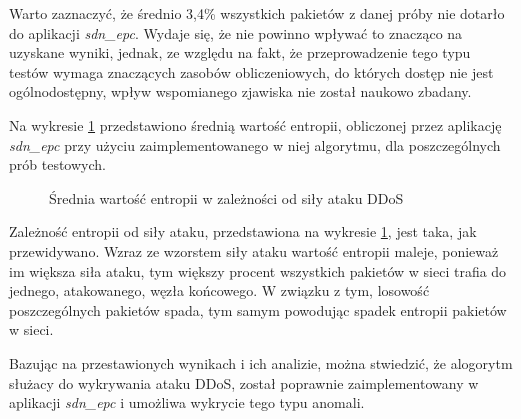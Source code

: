 Warto zaznaczyć, że średnio 3,4\% wszystkich pakietów z danej próby nie dotarło
do aplikacji \textit{sdn\_epc}. Wydaje się, że nie powinno wpływać to znacząco
na uzyskane wyniki, jednak, ze względu na fakt, że przeprowadzenie tego typu
testów wymaga znaczących zasobów obliczeniowych, do których dostęp nie jest
ogólnodostępny, wpływ wspomianego zjawiska nie został naukowo zbadany.

Na wykresie \ref{plot:entropy} przedstawiono średnią wartość entropii,
obliczonej przez aplikację \textit{sdn\_epc} przy użyciu zaimplementowanego w
niej algorytmu, dla poszczególnych prób testowych.

\begin{figure}[h]
\centering
{}
\caption{Średnia wartość entropii w zależności od siły ataku DDoS}
\label{plot:entropy}
\end{figure}

Zależność entropii od siły ataku, przedstawiona na wykresie \ref{plot:entropy},
jest taka, jak przewidywano. Wzraz ze wzorstem siły ataku wartość entropii
maleje, ponieważ im większa siła ataku, tym większy procent wszystkich pakietów
w sieci trafia do jednego, atakowanego, węzła końcowego. W związku z tym,
losowość poszczególnych pakietów spada, tym samym powodując spadek entropii
pakietów w sieci.

Bazując na przestawionych wynikach i ich analizie, można stwiedzić, że alogorytm
służacy do wykrywania ataku DDoS, został poprawnie zaimplementowany w aplikacji
\textit{sdn\_epc} i umożliwa wykrycie tego typu anomali. 
